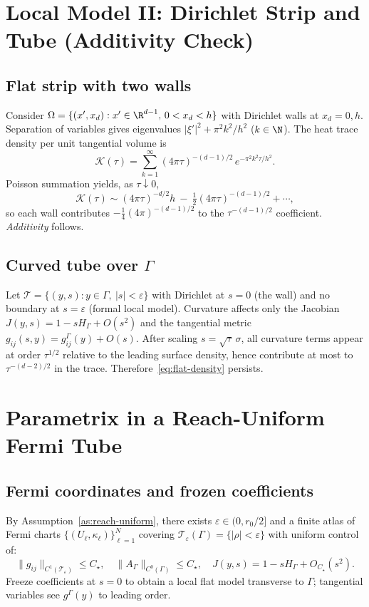 \section{Local Model II: Dirichlet Strip and Tube (Additivity Check)}
\label{sec:model-strip}

\subsection{Flat strip with two walls}
Consider $\Omega=\{(x',x_d): x'\in\R^{d-1},\, 0<x_d<h\}$ with Dirichlet walls at $x_d=0,h$.
Separation of variables gives eigenvalues $|\xi'|^2+\pi^2k^2/h^2$ ($k\in\N$). The heat trace density per unit tangential volume is
\[
\mathcal K(\tau)=\sum_{k=1}^\infty (4\pi\tau)^{-(d-1)/2}\,e^{-\pi^2k^2\tau/h^2}.
\]
Poisson summation yields, as $\tau\downarrow 0$,
\[
\mathcal K(\tau)\sim (4\pi\tau)^{-d/2}h\ -\ \tfrac12(4\pi\tau)^{-(d-1)/2}+\cdots,
\]
so each wall contributes $-\tfrac14(4\pi)^{-(d-1)/2}$ to the $\tau^{-(d-1)/2}$ coefficient. \emph{Additivity} follows.

\subsection{Curved tube over $\Gamma$}
Let $\mathcal T=\{(y,s): y\in \Gamma,\ |s|<\varepsilon\}$ with Dirichlet at $s=0$ (the wall) and no boundary at $s=\varepsilon$ (formal local model).
Curvature affects only the Jacobian $J(y,s)=1-sH_\Gamma+O(s^2)$ and the tangential metric $g_{ij}(s,y)=g^\Gamma_{ij}(y)+O(s)$.
After scaling $s=\sqrt{\tau}\,\sigma$, all curvature terms appear at order $\tau^{1/2}$ relative to the leading surface density, hence contribute at most to $\tau^{-(d-2)/2}$ in the trace. Therefore~\eqref{eq:flat-density} persists.

\section{Parametrix in a Reach-Uniform Fermi Tube}
\label{sec:parametrix}

\subsection{Fermi coordinates and frozen coefficients}
By Assumption~\ref{as:reach-uniform}, there exists $\varepsilon\in(0,r_0/2]$ and a finite atlas of Fermi charts $\{(U_\ell,\kappa_\ell)\}_{\ell=1}^N$ covering $\mathcal T_\varepsilon(\Gamma)=\{|\rho|<\varepsilon\}$ with uniform control of:
\[
\|g_{ij}\|_{C^1(\mathcal T_\varepsilon)}\le C_\star,\quad
\|A_\Gamma\|_{C^0(\Gamma)}\le C_\star,\quad
J(y,s)=1-sH_\Gamma+O_{C_\star}(s^2).
\]
Freeze coefficients at $s=0$ to obtain a local flat model transverse to $\Gamma$; tangential variables see $g^\Gamma(y)$ to leading order.

